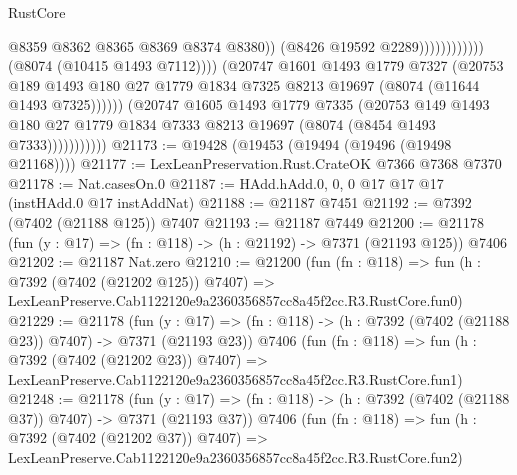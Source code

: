 \begin{lexlean}{RustCore}
\begin{coremodule}
                                                    @8359
                                                    @8362
                                                    @8365
                                                    @8369
                                                    @8374
                                                    @8380))
                                                (@8426 @19592 @2289))))))))))))
                          (@8074 (@10415 @1493 @7112))))
                      (@20747
                        @1601
                        @1493
                        @1779
                        @7327
                        (@20753
                          @189
                          @1493
                          @180
                          @27
                          @1779
                          @1834
                          @7325
                          @8213
                          @19697
                          (@8074 (@11644 @1493 @7325))))))
                  (@20747
                    @1605
                    @1493
                    @1779
                    @7335
                    (@20753
                      @149
                      @1493
                      @180
                      @27
                      @1779
                      @1834
                      @7333
                      @8213
                      @19697
                      (@8074 (@8454 @1493 @7333)))))))))))
@21173 := @19428 (@19453 (@19494 (@19496 (@19498 @21168))))
@21177 := LexLeanPreservation.Rust.CrateOK @7366 @7368 @7370
@21178 := Nat.casesOn.{0}
@21187 := HAdd.hAdd.{0, 0, 0} @17 @17 @17 (instHAdd.{0} @17 instAddNat)
@21188 := @21187 @7451
@21192 := @7392 (@7402 (@21188 @125)) @7407
@21193 := @21187 @7449
@21200 := @21178 (fun (y : @17) => (fn : @118) -> (h : @21192) -> @7371 (@21193 @125)) @7406
@21202 := @21187 Nat.zero
@21210 := @21200
    (fun (fn : @118) =>
    fun (h : @7392 (@7402 (@21202 @125)) @7407) =>
    LexLeanPreserve.Cab1122120e9a2360356857cc8a45f2cc.R3.RustCore.fun0)
@21229 := @21178
    (fun (y : @17) => (fn : @118) -> (h : @7392 (@7402 (@21188 @23)) @7407) -> @7371 (@21193 @23))
    @7406
    (fun (fn : @118) =>
    fun (h : @7392 (@7402 (@21202 @23)) @7407) =>
    LexLeanPreserve.Cab1122120e9a2360356857cc8a45f2cc.R3.RustCore.fun1)
@21248 := @21178
    (fun (y : @17) => (fn : @118) -> (h : @7392 (@7402 (@21188 @37)) @7407) -> @7371 (@21193 @37))
    @7406
    (fun (fn : @118) =>
    fun (h : @7392 (@7402 (@21202 @37)) @7407) =>
    LexLeanPreserve.Cab1122120e9a2360356857cc8a45f2cc.R3.RustCore.fun2)

\end{coremodule}
\end{lexlean}
